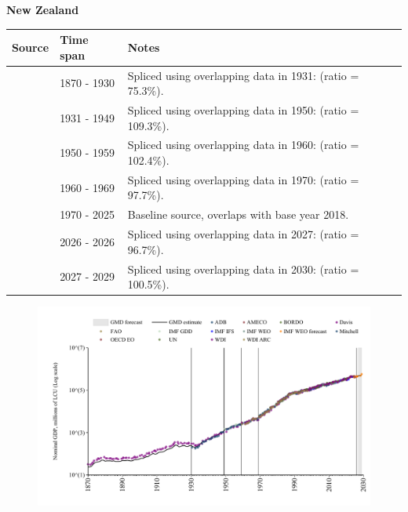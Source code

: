 \documentclass[12pt,a4paper,landscape]{article}
\begin{document}
\begin{adjustbox}{max totalsize={\paperwidth}{\paperheight},center}
\begin{minipage}[t][\textheight][t]{\textwidth}
\vspace*{0.5cm}
{}
\begin{center}
{\Large\bfseries New Zealand}
\end{center}
\vspace{0.5cm}
\begin{table}[H]
\centering
\small
\begin{tabular}{|l|l|l|}
\hline
\textbf{Source} & \textbf{Time span} & \textbf{Notes} \\
\hline
\rowcolor{white}\cite{Davis}& 1870 - 1930 &Spliced using overlapping data in 1931: (ratio = 75.3\%).\\
\rowcolor{lightgray}\cite{Mitchell}& 1931 - 1949 &Spliced using overlapping data in 1950: (ratio = 109.3\%).\\
\rowcolor{white}\cite{IMF_GDD}& 1950 - 1959 &Spliced using overlapping data in 1960: (ratio = 102.4\%).\\
\rowcolor{lightgray}\cite{AMECO}& 1960 - 1969 &Spliced using overlapping data in 1970: (ratio = 97.7\%).\\
\rowcolor{white}\cite{OECD_EO}& 1970 - 2025 &Baseline source, overlaps with base year 2018.\\
\rowcolor{lightgray}\cite{AMECO}& 2026 - 2026 &Spliced using overlapping data in 2027: (ratio = 96.7\%).\\
\rowcolor{white}\cite{IMF_WEO_forecast}& 2027 - 2029 &Spliced using overlapping data in 2030: (ratio = 100.5\%).\\
\hline
\end{tabular}
\end{table}
\begin{figure}[H]
\centering
\includegraphics[width=\textwidth,height=0.6\textheight,keepaspectratio]{graphs/NZL_nGDP.pdf}
\end{figure}
\end{minipage}
\end{adjustbox}
\end{document}
